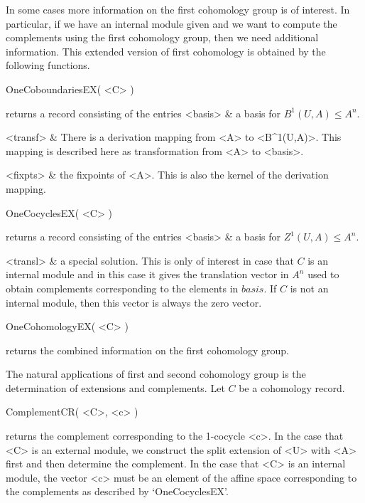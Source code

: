 
In some cases more information on the first cohomology group is
of interest. In particular, if we have an internal module given and
we want to compute the complements using the first cohomology group, 
then we need additional information. This extended version of first 
cohomology is obtained by the following functions.

\>OneCoboundariesEX( <C> )

returns a record consisting of the entries
\beginitems
<basis> &
       a basis for $B^1(U, A) \leq A^n$.

<transf> &
      There is a derivation mapping from <A> to <B^1(U,A)>. This mapping
      is described here as transformation from <A> to <basis>. 

<fixpts> &
      the fixpoints of <A>. This is also the kernel of the derivation mapping.
\enditems

\>OneCocyclesEX( <C> )

returns a record consisting of the entries
\beginitems
<basis> &
      a basis for $Z^1(U, A) \leq A^n$.

<transl> & 
      a special solution. This is only of interest in case that $C$ is 
      an internal module and in this case it gives the translation vector 
      in $A^n$ used to obtain complements corresponding to the elements in 
      $basis$. If $C$ is not an internal module, then this vector is 
      always the zero vector.
\enditems

\>OneCohomologyEX( <C> )

       returns the combined information on the first cohomology group. 


The natural applications of first and second cohomology group is
the determination of extensions and complements. Let $C$ be a 
cohomology record. 

\> ComplementCR( <C>, <c> )

returns the complement corresponding to the 1-cocycle <c>. In the case
that <C> is an external module, we construct the split extension of <U>
with <A> first and then determine the complement. In the case that <C> 
is an internal module, the vector <c> must be an element of the affine
space corresponding to the complements as described by `OneCocyclesEX'.

